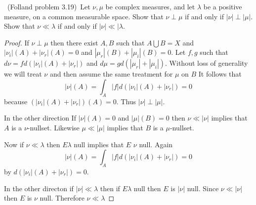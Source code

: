\documentclass[11pt]{amsart}
\theoremstyle{definition}
\numberwithin{theorem}{section}
\numberwithin{definition}{section}
\numberwithin{equation}{section}
\begin{document}
\medskip {}\ (Folland problem 3.19)\ 
Let $\nu,\mu$ be complex measures, and let $\lambda$ be a positive measure,
on a common measurable space.
Show that $\nu\perp\mu$ if and only if $|\nu|\perp |\mu|$.
Show that $\nu\ll \lambda $ if and only if $|\nu|\ll|\lambda$.
\begin{proof}
	If $\nu \perp \mu$ then there exist $A,B$ such that $A \bigcup B = X$
	and $|\nu_i|(A) + |\nu_r|(A) = 0$ and $|\mu_r|(B) + |\mu_i|(B) = 0$.
	Let $f, g$ such that $d\nu = f d(|\nu_i|(A) + |\nu_r|)$ and
	$d \mu = g d(|\mu_r| + |\mu_i|)$. 
	Without loss of generality we will treat $\nu$ and then assume the same treatment for $\mu$
	on $B$
	It follows that
	\begin{equation*}
		|\nu|(A) = \int_A |f| d(|\nu_i|(A) + |\nu_r|) = 0
	\end{equation*}
	because $(|\nu_i|(A) + |\nu_r|)(A) = 0$.
	Thus $|\nu| \perp |\mu|.$

	In the other direction If $|\nu|(A) =0$ and $|\mu|(B) = 0$ then $\nu \ll |\nu|$ implies
	that $A$ is a $\nu$-nullset. Likewise
	$\mu \ll |\mu|$ implies that $B$ is a $\mu$-nullset.

	Now if $\nu \ll \lambda$ then $E \lambda$ null implies that $E$ $\nu$ null.
	Again 
	\begin{equation*}
		|\nu|(A) = \int_A |f| d(|\nu_i|(A) + |\nu_r|) = 0
	\end{equation*}
	by $d(|\nu_i|(A) + |\nu_r|) = 0$. 

	In the other directon if $|\nu| \ll \lambda$ then if $E \lambda$ null
	then $E$ is $|\nu|$ null. Since $\nu \ll |\nu|$ then $E$ is $\nu$ null.
	Therefore $\nu \ll \lambda$

\end{proof}
\end{document}

